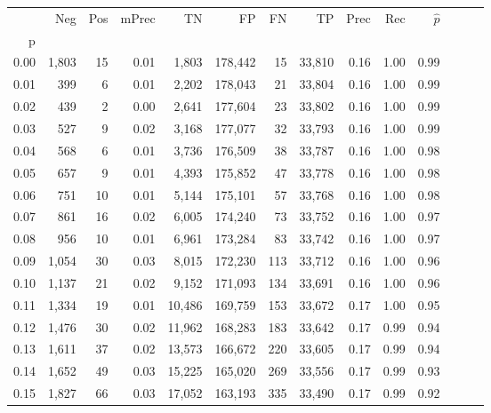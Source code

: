 \begin{tabular}{rrrrrrrrrrrrrr}
\toprule
{} &    Neg &  Pos & mPrec &       TN &       FP &      FN &      TP &  Prec &   Rec & $\hat{p}$ \\
p    &        &      &       &          &          &         &         &       &       &           \\
\midrule
0.00 &  1,803 &   15 &  0.01 &    1,803 &  178,442 &      15 &  33,810 &  0.16 &  1.00 &      0.99 \\
0.01 &    399 &    6 &  0.01 &    2,202 &  178,043 &      21 &  33,804 &  0.16 &  1.00 &      0.99 \\
0.02 &    439 &    2 &  0.00 &    2,641 &  177,604 &      23 &  33,802 &  0.16 &  1.00 &      0.99 \\
0.03 &    527 &    9 &  0.02 &    3,168 &  177,077 &      32 &  33,793 &  0.16 &  1.00 &      0.99 \\
0.04 &    568 &    6 &  0.01 &    3,736 &  176,509 &      38 &  33,787 &  0.16 &  1.00 &      0.98 \\
0.05 &    657 &    9 &  0.01 &    4,393 &  175,852 &      47 &  33,778 &  0.16 &  1.00 &      0.98 \\
0.06 &    751 &   10 &  0.01 &    5,144 &  175,101 &      57 &  33,768 &  0.16 &  1.00 &      0.98 \\
0.07 &    861 &   16 &  0.02 &    6,005 &  174,240 &      73 &  33,752 &  0.16 &  1.00 &      0.97 \\
0.08 &    956 &   10 &  0.01 &    6,961 &  173,284 &      83 &  33,742 &  0.16 &  1.00 &      0.97 \\
0.09 &  1,054 &   30 &  0.03 &    8,015 &  172,230 &     113 &  33,712 &  0.16 &  1.00 &      0.96 \\
0.10 &  1,137 &   21 &  0.02 &    9,152 &  171,093 &     134 &  33,691 &  0.16 &  1.00 &      0.96 \\
0.11 &  1,334 &   19 &  0.01 &   10,486 &  169,759 &     153 &  33,672 &  0.17 &  1.00 &      0.95 \\
0.12 &  1,476 &   30 &  0.02 &   11,962 &  168,283 &     183 &  33,642 &  0.17 &  0.99 &      0.94 \\
0.13 &  1,611 &   37 &  0.02 &   13,573 &  166,672 &     220 &  33,605 &  0.17 &  0.99 &      0.94 \\
0.14 &  1,652 &   49 &  0.03 &   15,225 &  165,020 &     269 &  33,556 &  0.17 &  0.99 &      0.93 \\
0.15 &  1,827 &   66 &  0.03 &   17,052 &  163,193 &     335 &  33,490 &  0.17 &  0.99 &      0.92 \\

\end{tabular}
